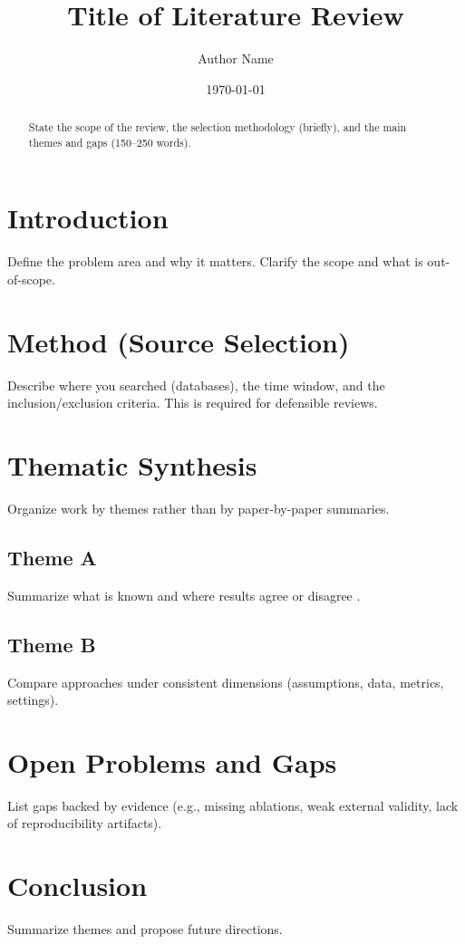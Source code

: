\documentclass[11pt]{article}
\title{Title of Literature Review}
\author{Author Name}
\date{\today}
\begin{document}
\maketitle

\begin{abstract}
State the scope of the review, the selection methodology (briefly), and the main themes and gaps (150--250 words).
\end{abstract}

\section{Introduction}
Define the problem area and why it matters. Clarify the scope and what is out-of-scope.

\section{Method (Source Selection)}
Describe where you searched (databases), the time window, and the inclusion/exclusion criteria. This is required for defensible reviews.

\section{Thematic Synthesis}
Organize work by themes rather than by paper-by-paper summaries.

\subsection{Theme A}
Summarize what is known and where results agree or disagree \citep{smith2023,jones2022}.

\subsection{Theme B}
Compare approaches under consistent dimensions (assumptions, data, metrics, settings).

\section{Open Problems and Gaps}
List gaps backed by evidence (e.g., missing ablations, weak external validity, lack of reproducibility artifacts).

\section{Conclusion}
Summarize themes and propose future directions.



\end{document}
